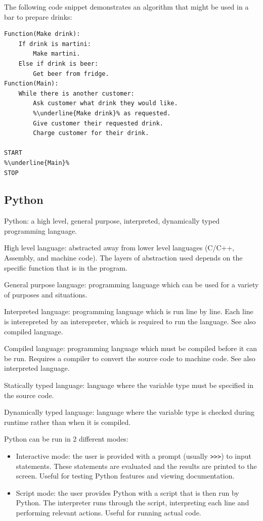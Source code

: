 \documentclass[a4paper]{report}
\begin{document}
The following code snippet demonstrates an algorithm that might be used in a
bar to prepare drinks:

\begin{lstlisting}[language=pseudo]
Function(Make drink):
	If drink is martini:
		Make martini.
	Else if drink is beer:
		Get beer from fridge.
Function(Main):
	While there is another customer:
		Ask customer what drink they would like.
		%\underline{Make drink}% as requested.
		Give customer their requested drink.
		Charge customer for their drink.

START
%\underline{Main}%
STOP
\end{lstlisting}

\subsection{Python}

Python: a high level, general purpose, interpreted, dynamically typed
programming language.

High level language: abstracted away from lower level languages (C/C++,
Assembly, and machine code). The layers of abstraction used depends on the
specific function that is in the program.

General purpose language: programming language which can be used for a
variety of purposes and situations.

Interpreted language: programming language which is run line by line. Each
line is interepreted by an interepreter, which is required to run the
language. See also compiled language.

Compiled language: programming language which must be compiled before it can
be run. Requires a compiler to convert the source code to machine code. See
also interpreted language.

Statically typed language: language where the variable type must be specified
in the source code.

Dynamically typed language: language where the variable type is checked during
runtime rather than when it is compiled.

Python can be run in 2 different modes:

\begin{itemize}
	\item{Interactive mode: the user is provided with a prompt (usually
		\texttt{>>>}) to input statements. These statements are
		evaluated and the results are printed to the screen. Useful
		for testing Python features and viewing documentation.}
	\item{Script mode: the user provides Python with a script that is then
		run by Python. The interpreter runs through the script,
		interpreting each line and performing relevant actions. Useful
		for running actual code.}
\end{itemize}
\end{document}
